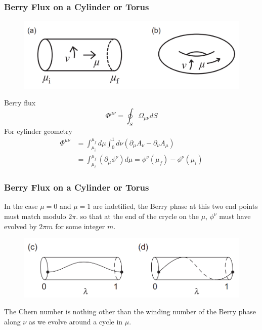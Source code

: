 \documentclass{beamer}
\begin{document}
\begin{frame}
\frametitle{Berry Flux on a Cylinder or Torus}
\begin{figure}
\centering
\includegraphics[scale=0.4]{pic/p3.png}
\end{figure}
Berry flux
\begin{equation}
\Phi^{\mu\nu}=\oint_S\Omega_{\mu\nu}dS
\end{equation}
For cylinder geometry
\begin{equation}
\begin{aligned}
\Phi^{\mu\nu}&=\int_{\mu_i}^{\mu_f}d\mu\int_{0}^{1}d\nu(\partial_\mu A_\nu-\partial_\nu A_\mu)\\
&=\int_{\mu_i}^{\mu_f}(\partial_\mu\phi^\nu)d\mu=\phi^\nu(\mu_f)-\phi^\nu(\mu_i)
\end{aligned}
\end{equation}
\end{frame}
\begin{frame}
\frametitle{Berry Flux on a Cylinder or Torus}
In the case $\mu=0$ and $\mu=1$ are indetified, the Berry phase at this two end points must match modulo $2\pi$. so that at the end of the crycle on the $\mu$, $\phi^\nu$ must have evolved by $2\pi m$ for some integer $m$. 
\begin{figure}
\centering
\includegraphics[scale=0.5]{pic/p4.png}
\end{figure}
\begin{block}{}
The Chern number is nothing other than the winding number of the Berry phase along $\nu$ as we evolve around a cycle in $\mu$.
\end{block}
\end{frame}
\end{document}
